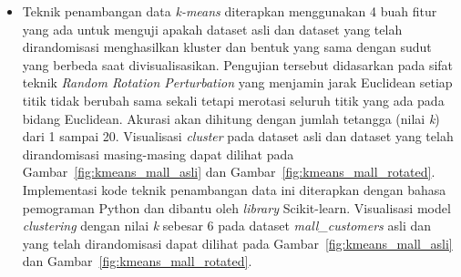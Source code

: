 \begin{itemize}
	\begin{figure}
		\centering
		\texttt{[image: siluet\_mall\_customers]}
		\caption{Grafik \textit{Sillhoutte Score} model \textit{clustering} pada dataset \textit{mall\_customers}}
		\label{fig:siluet_mall_customers}
	\end{figure}
	
	\noindent\begin{minipage}{.44\textwidth}
	\begin{lstlisting}[caption=Sillhoutte Score Dataset (Asli),frame=tlrb, label=mall_customers_siluet_asli]{Name}
Sillhoutte Score setiap K
pada dataset asli: 
2: 0.293166070535953
3: 0.3839349967742105
4: 0.40546302077733304
5: 0.44504314844253573
6: 0.4523443947724053
7: 0.43978902692261157
8: 0.42790288922594905
9: 0.4137641526186506
10: 0.3750147687842441
	\end{lstlisting}
	\end{minipage}\hfill
	\begin{minipage}{.44\textwidth}
	\begin{lstlisting}[caption=Sillhoutte Score (Randomisasi),frame=tlrb, label=mall_customers_siluet_randomisasi]{Name}
Sillhoutte Score setiap K
pada dataset randomisasi: 
2: 0.29316607053507854
3: 0.383934996807901
4: 0.40546302082487856
5: 0.44428597567883826
6: 0.4523443947780976
7: 0.44128075766857394
8: 0.42815090435529995
9: 0.3861502477348431
10: 0.3897532214988177
	\end{lstlisting}
	\end{minipage}

	\item Teknik penambangan data \textit{k-means} diterapkan menggunakan 4 buah fitur yang ada untuk menguji apakah dataset asli dan dataset yang telah dirandomisasi menghasilkan kluster dan bentuk yang sama dengan sudut yang berbeda saat divisualisasikan. Pengujian tersebut didasarkan pada sifat teknik \textit{Random Rotation Perturbation} yang menjamin jarak Euclidean setiap titik tidak berubah sama sekali tetapi merotasi seluruh titik yang ada pada bidang Euclidean. Akurasi akan dihitung dengan jumlah tetangga (nilai \textit{k}) dari 1 sampai 20. Visualisasi \textit{cluster} pada dataset asli dan dataset yang telah dirandomisasi masing-masing dapat dilihat pada Gambar~\ref{fig:kmeans_mall_asli} dan Gambar~\ref{fig:kmeans_mall_rotated}. Implementasi kode teknik penambangan data ini diterapkan dengan bahasa pemograman Python dan dibantu oleh \textit{library} Scikit-learn. Visualisasi model \textit{clustering} dengan nilai \textit{k} sebesar 6 pada dataset \textit{mall\_customers} asli dan yang telah dirandomisasi dapat dilihat pada Gambar~\ref{fig:kmeans_mall_asli} dan Gambar~\ref{fig:kmeans_mall_rotated}. 


\end{itemize}
